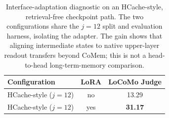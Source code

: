 \begin{table}[t]
\centering
\small
\setlength{\tabcolsep}{5pt}
\begin{tabular}{@{}lcc@{}}
\toprule
\textbf{Configuration} & \textbf{LoRA} & \textbf{LoCoMo Judge} \\
\midrule
HCache-style ($j{=}12$) & no  & 13.29 \\
HCache-style ($j{=}12$) & yes & \textbf{31.17} \\
\bottomrule
\end{tabular}
\caption{Interface-adaptation diagnostic on an HCache-style, retrieval-free
checkpoint path. The two configurations share the $j{=}12$ split and evaluation
harness, isolating the adapter. The gain shows that aligning intermediate states
to native upper-layer readout transfers beyond CoMem; this is not a head-to-head
long-term-memory comparison.}
\label{tab:hcache-lora}
\end{table}